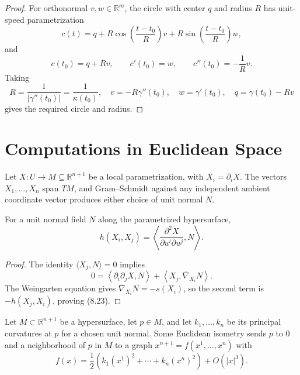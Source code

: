 \begin{proof}
\sketch
For orthonormal $v,w\in\mathbb R^m$, the circle with center $q$ and radius
$R$ has unit-speed parametrization
\[
c(t)=q+R\cos\left(\frac{t-t_0}{R}\right)v
+R\sin\left(\frac{t-t_0}{R}\right)w,
\]
and
\[
c(t_0)=q+Rv,
\qquad c'(t_0)=w,
\qquad c''(t_0)=-\frac1Rv.
\]
Taking
\[
R=\frac1{|\gamma''(t_0)|}=\frac1{\kappa(t_0)},
\quad v=-R\gamma''(t_0),
\quad w=\gamma'(t_0),
\quad q=\gamma(t_0)-Rv
\]
gives the required circle and radius.
\end{proof}

\section{Computations in Euclidean Space}

Let $X:U\to M\subseteq\mathbb R^{n+1}$ be a local parametrization, with
$X_i=\partial_iX$.  The vectors $X_1,\ldots,X_n$ span $TM$, and Gram--Schmidt
against any independent ambient coordinate vector produces either choice of
unit normal $N$.

\begin{proposition}
\label{prop:second-fundamental-form-coordinate-formula}
For a unit normal field $N$ along the parametrized hypersurface,
\begin{equation}
h(X_i,X_j)=\left\langle
\frac{\partial^2X}{\partial u^i\partial u^j},N\right\rangle. \tag{8.23}
\end{equation}
\end{proposition}

\begin{proof}
\sketch
The identity $\langle X_j,N\rangle=0$ implies
\[
0=\left\langle\partial_i\partial_jX,N\right\rangle
+\left\langle X_j,\overline\nabla_{X_i}N\right\rangle.
\]
The Weingarten equation gives
$\overline\nabla_{X_i}N=-s(X_i)$, so the second term is
$-h(X_j,X_i)$, proving (8.23).
\end{proof}

\begin{proposition}
\label{prop:principal-curvatures-local-shape}
Let $M\subset\mathbb R^{n+1}$ be a hypersurface, let $p\in M$, and let
$k_1,\ldots,k_n$ be its principal curvatures at $p$ for a chosen unit normal.
Some Euclidean isometry sends $p$ to $0$ and a neighborhood of $p$ in $M$ to
a graph $x^{n+1}=f(x^1,\ldots,x^n)$ with
\begin{equation}
f(x)=\frac12\left(k_1(x^1)^2+\cdots+k_n(x^n)^2\right)+O(|x|^3). \tag{8.24}
\end{equation}
\end{proposition}

